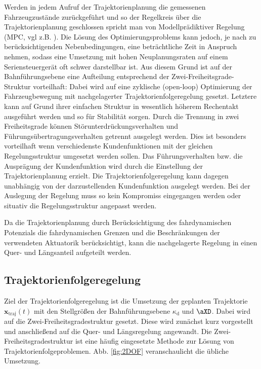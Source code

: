 Werden in jedem Aufruf der Trajektorienplanung die gemessenen Fahrzeugzustände zurückgeführt und so der Regelkreis über die Trajektorienplanung geschlossen spricht man von Modellprädiktiver Regelung (MPC, vgl z.B.  \cite{Rawlings2000}).  Die Lösung des Optimierungsproblems kann jedoch, je nach zu berücksichtigenden Nebenbedingungen,  eine beträchtliche Zeit in Anspruch nehmen, sodass eine Umsetzung mit hohen Neuplanungsraten auf einem Seriensteuergerät oft schwer darstellbar ist. Aus diesem Grund ist auf der Bahnführungsebene eine Aufteilung entsprechend der Zwei-Freiheitsgrade-Struktur vorteilhaft: Dabei wird auf eine zyklische (open-loop) Optimierung der Fahrzeugbewegung mit nachgelagerter Trajektorienfolgeregelung gesetzt.  Letztere kann auf Grund ihrer einfachen Struktur in wesentlich höherem Rechentakt ausgeführt werden und so für Stabilität sorgen. Durch die Trennung in zwei Freiheitsgrade können Störunterdrückungsverhalten und Führungsübertragungsverhalten getrennt ausgelegt werden. Dies ist besonders vorteilhaft wenn verschiedenste Kundenfunktionen mit der gleichen Regelungsstruktur umgesetzt werden sollen. Das Führungsverhalten bzw. die Ausprägung der Kundenfunktion wird durch die Einstellung der Trajektorienplanung erzielt. Die Trajektorienfolgeregelung kann dagegen unabhängig von der darzustellenden Kundenfunktion ausgelegt werden. Bei der Auslegung der Regelung muss so kein Kompromiss eingegangen werden oder situativ die Regelungsstruktur angepasst werden.


Da die Trajektorienplanung durch Berücksichtigung des fahrdynamischen Potenzials die fahrdynamischen Grenzen und die Beschränkungen der verwendeten Aktuatorik berücksichtigt, kann die nachgelagerte Regelung in einen Quer- und Längsanteil aufgeteilt werden.
\subsection{Trajektorienfolgeregelung}
Ziel der Trajektorienfolgeregelung ist die Umsetzung der geplanten Trajektorie $\mathbf{x}_\mathrm{traj}(t)$ mit den Stellgrößen der Bahnführungsebene $\kappa_\mathrm{d}$ und $\aXD$.  Dabei wird auf die Zwei-Freiheitsgradestruktur gesetzt.  Diese wird zunächst kurz vorgestellt und anschließend auf die Quer- und Längsregelung angewandt.  
Die Zwei-Freiheitsgradestruktur ist eine häufig eingesetzte Methode zur Lösung von Trajektorienfolgeproblemen.  Abb. \ref{fig:2DOF} veranschaulicht die übliche Umsetzung.

